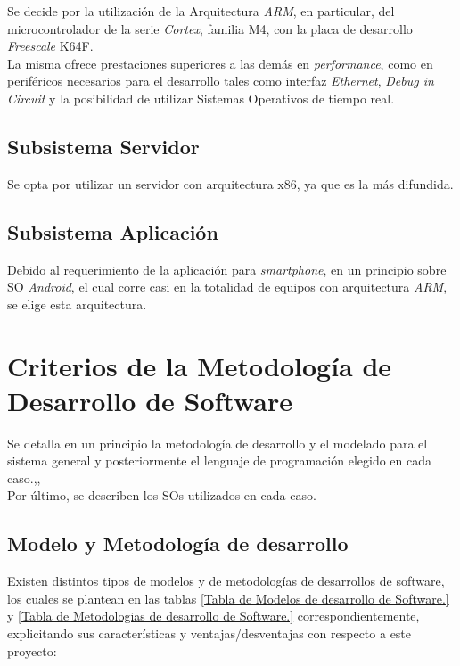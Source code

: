 Se decide por la utilización de la Arquitectura \textit{ARM}, en particular, del microcontrolador de la serie \textit{Cortex}, familia M4, con la placa de desarrollo \textit{Freescale} K64F.\cite{embedded2} \\
La misma ofrece prestaciones superiores a las demás en \textit{performance}, como en periféricos necesarios para el desarrollo tales como interfaz \textit{Ethernet},\textit{ Debug in Circuit} y la posibilidad de utilizar Sistemas Operativos de tiempo real.\\



\subsection{Subsistema Servidor}

Se opta por utilizar un servidor con arquitectura x86, ya que es la más difundida.

\subsection{Subsistema Aplicación}
Debido al requerimiento de la aplicación para \textit{smartphone}, en un principio sobre SO \textit{Android}, el cual corre casi en la totalidad de equipos con arquitectura \textit{ARM}, se elige esta arquitectura.

\newpage
\section{Criterios de la Metodología de Desarrollo de Software}
Se detalla en un principio la metodología de desarrollo y el modelado para el sistema general y posteriormente el lenguaje de programación elegido en cada caso.\citep{softIng2Book},\cite{softIng3Book},\cite{softIng5Book}\\
Por último, se describen los SOs utilizados en cada caso.\\

	\subsection{Modelo y Metodología de desarrollo} 
Existen distintos tipos de modelos y de metodologías de desarrollos de software, los cuales se plantean en las tablas \ref{Tabla de Modelos de desarrollo de Software.} y \ref{Tabla de Metodologias de desarrollo de Software.} correspondientemente, explicitando sus características y ventajas/desventajas con respecto a este proyecto:\\

